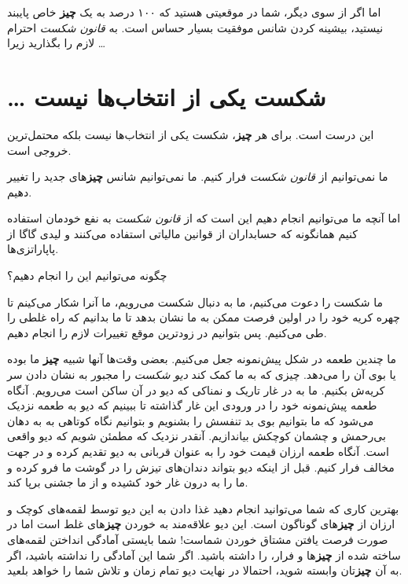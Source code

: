 اما اگر از سوی دیگر، شما در موقعیتی هستید که ۱۰۰ درصد به یک \textbf{چیز}
خاص پایبند نیستید، بیشینه کردن شانس موفقیت بسیار حساس است. به
\emph{قانون شکست} احترام لازم را بگذارید زیرا \ldots{}

\section{\ldots{} شکست یکی از انتخاب‌ها
نیست}\label{ux634ux6a9ux633ux62a-ux6ccux6a9ux6cc-ux627ux632-ux627ux646ux62aux62eux627ux628ux647ux627-ux646ux6ccux633ux62a}

این درست است. برای هر \textbf{چیز}، شکست یکی از انتخاب‌ها نیست بلکه
محتمل‌ترین خروجی است.

ما نمی‌توانیم از \emph{قانون شکست} فرار کنیم. ما نمی‌توانیم شانس
\textbf{چیز}های جدید را تغییر دهیم.

اما آنچه ما می‌توانیم انجام دهیم این است که از \emph{قانون شکست} به نفع
خودمان استفاده کنیم همانگونه که حسابداران از قوانین مالیاتی استفاده
می‌کنند و لیدی گاگا از پاپاراتزی‌ها.

چگونه می‌توانیم این را انجام دهیم؟

ما شکست را دعوت می‌کنیم، ما به دنبال شکست می‌رویم، ما آنرا شکار می‌کینم
تا چهره کریه خود را در اولین فرصت ممکن به ما نشان بدهد تا ما بدانیم که
راه غلطی را طی می‌کنیم. پس بتوانیم در زودترین موقع تغییرات لازم را انجام
دهیم.

ما چندین طعمه در شکل پیش‌نمونه جعل می‌کنیم. بعضی وقت‌ها آنها شبیه
\textbf{چیز} ما بوده یا بوی آن را می‌دهد. چیزی که به ما کمک کند
\emph{دیو شکست} را مجبور به نشان دادن سر کریه‌ش بکنیم. ما به در غار
تاریک و نمناکی که دیو در آن ساکن است می‌رویم. آنگاه طعمه پیش‌نمونه خود
را در ورودی این غار گذاشته تا ببینیم که دیو به طعمه نزدیک می‌شود که ما
بتوانیم بوی بد تنفسش را بشنویم و بتوانیم نگاه کوتاهی به به دهان بی‌رحمش
و چشمان کوچکش بیاندازیم. آنقدر نزدیک که مطمئن شویم که دیو واقعی است.
آنگاه طعمه ارزان قیمت خود را به عنوان قربانی به دیو تقدیم کرده و در جهت
مخالف فرار کنیم. قبل از اینکه دیو بتواند دندان‌های تیزش را در گوشت ما
فرو کرده و ما را به درون غار خود کشیده و از ما جشنی برپا کند.

بهترین کاری که شما می‌توانید انجام دهید غذا دادن به این دیو توسط
لقمه‌های کوچک و ارزان از \textbf{چیز}های گوناگون است. این دیو علاقه‌مند
به خوردن \textbf{چیز}های غلط است اما در صورت فرصت یافتن مشتاق خوردن
شماست! شما بایستی آمادگی انداختن لقمه‌های ساخته شده از \textbf{چیز}ها و
فرار، را داشته باشید. اگر شما این آمادگی را نداشته باشید، اگر به آن
\textbf{چیز}تان وابسته شوید، احتمالا در نهایت دیو تمام زمان و تلاش شما
را خواهد بلعید.


